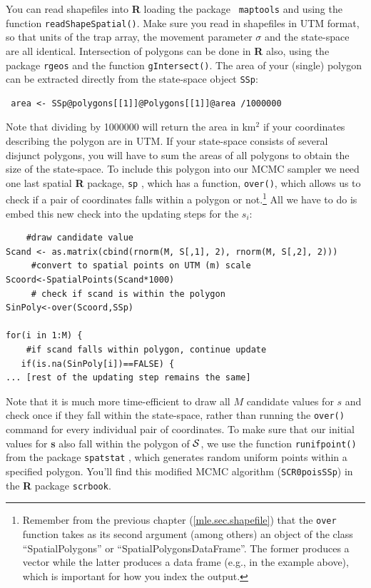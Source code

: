 You can read shapefiles into {\bf R} loading the package \mbox{\tt
maptools}
\citep{lewin-koh_etal:2011} and using the function
\verb#readShapeSpatial()#. Make sure you read in shapefiles in UTM format, so
that units of the trap array, the movement parameter $\sigma$ and the
state-space are all identical.
Intersection of polygons can be done
in {\bf R} also, using the package \mbox{\tt rgeos}
\citep{bivand_rundel:2011} and the
function \verb#gIntersect()#.
The area of your (single) polygon can be
extracted directly from the state-space object \mbox{\tt SSp}:

\begin{verbatim}
 area <- SSp@polygons[[1]]@Polygons[[1]]@area /1000000
\end{verbatim}

 Note that dividing by 1000000 will return the area in km$^2$ if your coordinates describing the polygon are in UTM. If your state-space consists of several disjunct polygons, you will have to sum the areas of all polygons to obtain the size of the state-space.
To include this polygon into our MCMC sampler we need one last spatial
{\bf R} package, \mbox{\tt sp} \citep{pebesma_bivand:2011}, which has a
function, \verb#over()#, which allows us to check if a pair of coordinates
falls within a polygon or not.\footnote{Remember from the previous chapter (\ref{mle.sec.shapefile}) that the {\tt over} function takes as its second argument (among others) an object of the class ``SpatialPolygons'' or ``SpatialPolygonsDataFrame''. The former produces a vector while the latter produces a data frame (e.g., in the example above), which is important for how you index the output.} All we have to do is embed this new check
into the updating steps for the $s_i$:
\begin{verbatim}
    #draw candidate value
Scand <- as.matrix(cbind(rnorm(M, S[,1], 2), rnorm(M, S[,2], 2)))
     #convert to spatial points on UTM (m) scale
Scoord<-SpatialPoints(Scand*1000)
     # check if scand is within the polygon
SinPoly<-over(Scoord,SSp)

for(i in 1:M) {
    #if scand falls within polygon, continue update
   if(is.na(SinPoly[i])==FALSE) {
... [rest of the updating step remains the same]
\end{verbatim}
Note that it is much more time-efficient to draw all $M$ candidate values
for {\bf $s$} and check once if they fall within the state-space, rather than
running the \verb#over()# command for every individual pair of
coordinates. To make sure that our initial values for {\bf s} also fall
within the polygon of ${\cal S}$, we use the function \verb#runifpoint()#
from the package \mbox{\tt spatstat} \citep{baddeley_turner:2005},
which generates random uniform points within a specified polygon. You'll
find this modified MCMC algorithm (\mbox{\tt SCR0poisSSp}) in the {\bf R}
package \mbox{\tt scrbook}.

